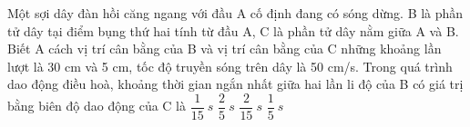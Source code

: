 \begin{vidu}%
 Một sợi dây đàn hồi căng ngang với đầu A cố định đang có sóng dừng. B là phần tử dây tại điểm bụng thứ hai tính từ đầu A, C là phần tử dây nằm giữa A và B. Biết A cách vị trí cân bằng của B và vị trí cân bằng của C những khoảng lần lượt là 30 cm và 5 cm, tốc độ truyền sóng trên dây là 50 cm/s. Trong quá trình dao động điều hoà, khoảng thời gian ngắn nhất giữa hai lần li độ của B có giá trị bằng biên độ dao động của C là
\choice
{$\dfrac{1}{15}\ s$}
{$\dfrac{2}{5}\ s$}
{$\dfrac{2}{15}\ s$}
{\True $\dfrac{1}{5}\ s$}
\end{vidu} 
 